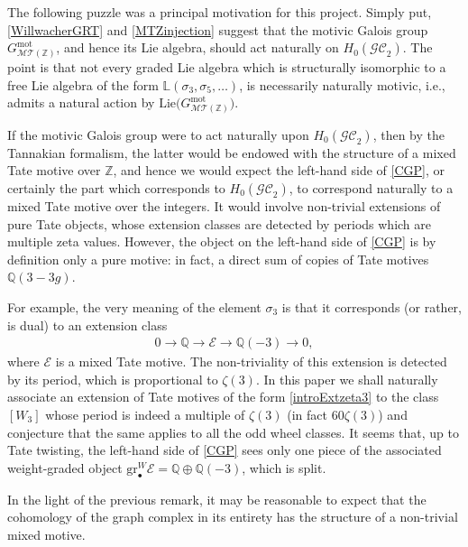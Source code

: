 \documentclass[pdftex]{sigma}%
\numberwithin{equation}{section}
\newcommand{\To}{\longrightarrow}
\newcommand{\Z}{\mathbb Z}
\newcommand{\Q}{\mathbb Q}
\newcommand{\GC}{\mathcal{GC}}
\newcommand{\0}{\color{blue}{\mathsf{0}}}
\begin{document}
\begin{rem} \label{remPuzzlezeta(3)} The following puzzle was a principal motivation for this project. Simply put, \eqref{WillwacherGRT} and \eqref{MTZinjection} suggest that the motivic Galois group $G^{\mathrm{mot}}_{\mathcal{MT}(\Z)}$, and hence its Lie algebra, should act naturally on $H_0(\GC_2)$. The point is that not every graded Lie algebra which is structurally isomorphic to a free Lie algebra of the form $\mathbb{L}(\sigma_3, \sigma_5,\dots )$, is necessarily naturally motivic, i.e., admits a natural action by $\mathrm{Lie} \big(G^{\mathrm{mot}}_{\mathcal{MT}(\Z)}\big)$.

If the motivic Galois group were to act naturally upon $H_0(\GC_2)$, then by the Tannakian formalism, the latter would be endowed with the structure of a mixed Tate motive over $\Z$, and hence we would expect the left-hand side of \eqref{CGP}, or certainly the part which corresponds to $H_0(\GC_2)$, to correspond naturally to a mixed Tate motive over the integers. It would involve non-trivial extensions of pure Tate objects, whose extension classes are detected by periods which are multiple zeta values. However, the object on the left-hand side of \eqref{CGP} is by definition only a pure motive: in fact, a direct sum of copies of Tate motives $\Q(3-3g)$.

For example, the very meaning of the element $\sigma_3$ is that it corresponds (or rather, is dual) to an extension class
\begin{gather} \label{introExtzeta3}
0 \To \Q \To \mathcal{E} \To \Q(-3) \To 0,
\end{gather}
where $\mathcal{E}$ is a mixed Tate motive.
The non-triviality of this extension is detected by its period, which is proportional to $\zeta(3)$.
In this paper we shall naturally associate an extension of Tate motives of the form \eqref{introExtzeta3} to the class $[W_3]$ whose period is indeed a multiple of $\zeta(3)$ (in fact $60 \zeta(3)$) and conjecture that the same applies to all the odd wheel classes.
It seems that, up to Tate twisting, the left-hand side of \eqref{CGP} sees only one piece of the associated weight-graded object $\mathrm{gr}_{\bullet}^W \mathcal{E} = \Q\oplus \Q(-3)$, which is split.
\end{rem}

In the light of the previous remark, it may be reasonable to expect that the cohomology of the graph complex in its entirety has the structure of a non-trivial mixed motive.

\medskip
\end{document}
